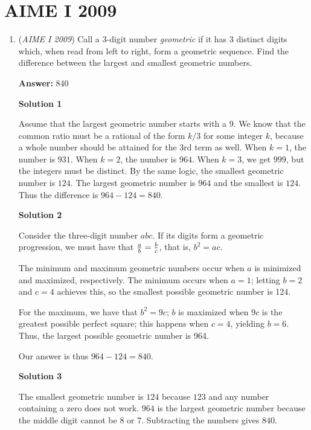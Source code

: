 \section{AIME I 2009}
        \begin{enumerate}
        	\item (\textit{AIME I 2009}) Call a $3$-digit number \textit{geometric} if it has $3$ distinct digits which, when read from left to right, form a geometric sequence.  Find the difference between the largest and smallest geometric numbers.


 
 \textbf{Answer: }840



\textbf{Solution 1}

Assume that the largest geometric number starts with a $9$. We know that the common ratio must be a rational of the form $k/3$ for some integer $k$, because a whole number should be attained for the 3rd term as well. When $k = 1$, the number is $931$. When $k = 2$, the number is $964$. When $k = 3$, we get $999$, but the integers must be distinct. By the same logic, the smallest geometric number is $124$. The largest geometric number is $964$ and the smallest is $124$. Thus the difference is $964 - 124 = \boxed{840}$.

 



\textbf{Solution 2}

Consider the three-digit number $abc$. If its digits form a geometric progression, we must have that ${a \over b} = {b \over c}$, that is, $b^2 = ac$. 

 The minimum and maximum geometric numbers occur when $a$ is minimized and maximized, respectively. The minimum occurs when $a = 1$; letting $b = 2$ and $c = 4$ achieves this, so the smallest possible geometric number is 124. 

 For the maximum, we have that $b^2 = 9c$; $b$ is maximized when $9c$ is the greatest possible perfect square; this happens when $c = 4$, yielding $b = 6$. Thus, the largest possible geometric number is 964. 

 Our answer is thus $964 - 124 = \boxed{840}$.

 



\textbf{Solution 3}

The smallest geometric number is $124$ because $123$ and any number containing a zero does not work. $964$ is the largest geometric number because the middle digit cannot be 8 or 7. Subtracting the numbers gives $\boxed{840}.$




\end{enumerate}
